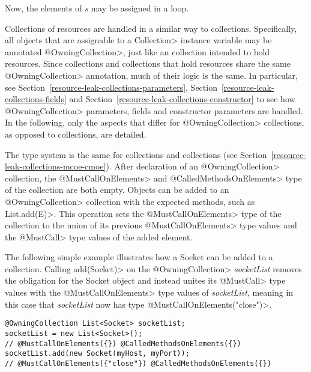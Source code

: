 Now, the elements of \textit{s} may be assigned in a loop.


Collections of resources are handled in a similar way to collections. Specifically, all objects that are assignable to a \<Collection> instance variable may be annotated \<@OwningCollection>, just like an collection intended to hold resources. Since collections and collections that hold resources share the same \<@OwningCollection> annotation, much of their logic is the same. In particular, see Section~\ref{resource-leak-collections-parameters}, Section~\ref{resource-leak-collections-fields} and Section~\ref{resource-leak-collections-constructor} to see how \<@OwningCollection> parameters, fields and constructor parameters are handled. In the following, only the aspects that differ for \<@OwningCollection> collections, as opposed to collections, are detailed.

The type system is the same for collections and collections (see Section~\ref{resource-leak-collections-mcoe-cmoe}). After declaration of an \<@OwningCollection> collection, the \<@MustCallOnElements> and \<@CalledMethodsOnElements> type of the collection are both empty. Objects can be added to an \<@OwningCollection> collection with the expected methods, such as \<List.add(E)>. This operation sets the \<@MustCallOnElements> type of the collection to the union of its previous \<@MustCallOnElements> type values and the \<@MustCall> type values of the added element.

The following simple example illustrates how a Socket can be added to a collection. Calling \<add(Socket)> on the \<@OwningCollection> \textit{socketList} removes the obligation for the Socket object and instead unites its \<@MustCall> type values with the \<@MustCallOnElements> type values of \textit{socketList}, meaning in this case that \textit{socketList} now has type  \<@MustCallOnElements({"close"})>.

\begin{verbatim}
@OwningCollection List<Socket> socketList;
socketList = new List<Socket>();
// @MustCallOnElements({}) @CalledMethodsOnElements({})
socketList.add(new Socket(myHost, myPort));
// @MustCallOnElements({"close"}) @CalledMethodsOnElements({})
\end{verbatim}

